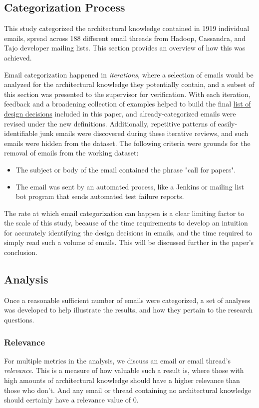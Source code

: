 \documentclass[a4paper, 12pt]{article}
\begin{document}
	
	
	\subsection{Categorization Process}
		This study categorized the architectural knowledge contained in 1919 individual emails, spread across 188 different email threads from Hadoop, Cassandra, and Tajo developer mailing lists. This section provides an overview of how this was achieved.
		
		Email categorization happened in \textit{iterations}, where a selection of emails would be analyzed for the architectural knowledge they potentially contain, and a subset of this section was presented to the supervisor for verification. With each iteration, feedback and a broadening collection of examples helped to build the final \hyperref[sec:design-decisions]{list of design decisions} included in this paper, and already-categorized emails were revised under the new definitions. Additionally, repetitive patterns of easily-identifiable junk emails were discovered during these iterative reviews, and such emails were hidden from the dataset. The following criteria were grounds for the removal of emails from the working dataset:
		
		\begin{itemize}
			\item The subject or body of the email contained the phrase "call for papers".
			\item The email was sent by an automated process, like a Jenkins or mailing list bot program that sends automated test failure reports.
		\end{itemize}
	
		The rate at which email categorization can happen is a clear limiting factor to the scale of this study, because of the time requirements to develop an intuition for accurately identifying the design decisions in emails, and the time required to simply read such a volume of emails. This will be discussed further in the paper's conclusion.
		
	\subsection{Analysis}
		Once a reasonable sufficient number of emails were categorized, a set of analyses was developed to help illustrate the results, and how they pertain to the research questions.
		
		\subsubsection{Relevance}
			For multiple metrics in the analysis, we discuss an email or email thread's \textit{relevance}. This is a measure of how valuable such a result is, where those with high amounts of architectural knowledge should have a higher relevance than those who don't. And any email or thread containing no architectural knowledge should certainly have a relevance value of 0.
			
\end{document}
